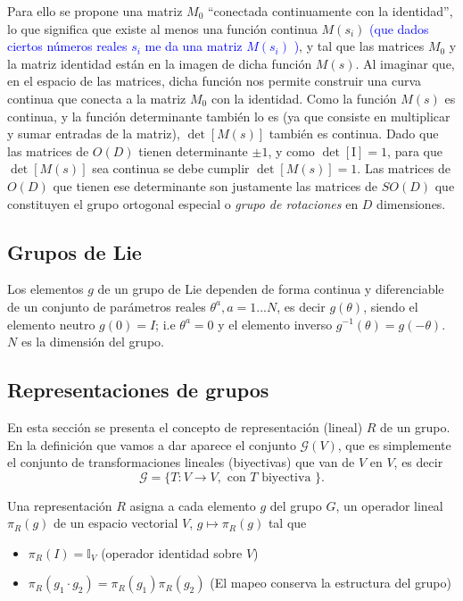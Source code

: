 \begin{solution}
Para ello se propone una matriz $M_{0}$ ``conectada continuamente con la identidad'', lo que significa que existe al menos una función continua $M\left(s_{i}\right)$ \textcolor{blue}{(que dados ciertos números reales $s_{i}$ me da una matriz $M\left(s_{i}\right)$ )}, y tal que las matrices $M_{0}$ y la matriz identidad están en la imagen de dicha función $M(s)$. Al imaginar que, en el espacio de las matrices, dicha función nos permite construir una curva continua que conecta a la matriz $M_{0}$ con la identidad. Como la función $M(s)$ es continua, y la función determinante también lo es (ya que consiste en multiplicar y sumar entradas de la matriz), $\operatorname{det}[M(s)]$ también es continua. Dado que las matrices de $O(D)$ tienen determinante $\pm 1$, y como $\operatorname{det}[\mathrm{I}]=1$, para que $\operatorname{det}[M(s)]$ sea continua se debe cumplir $\operatorname{det}[M(s)]=1$. Las matrices de $O(D)$ que tienen ese determinante son justamente las matrices de $S O(D)$ que constituyen el grupo ortogonal especial o \emph{grupo de rotaciones} en $D$ dimensiones.
\end{solution}

\subsection{Grupos de Lie}
Los elementos $g$ de un grupo de Lie dependen de forma continua y diferenciable de un conjunto de parámetros reales $\theta^{a},a=1...N$, es decir $g(\theta)$, siendo el elemento neutro $g(0) = I$; i.e $\theta^{a}=0$ y el elemento inverso $g^{-1}(\theta) = g(-\theta)$. $N$ es la dimensión del grupo.

\subsection{Representaciones de grupos}
En esta sección se presenta el concepto de representación (lineal) $R$ de un grupo. En la definición que vamos a dar aparece el conjunto $\mathcal{G}(V)$, que es simplemente el conjunto de transformaciones lineales (biyectivas) que van de $V$ en $V$, es decir
$$
\mathcal{G}=\{T: V \rightarrow V, \text { con } T \text { biyectiva }\}.
$$

\begin{definition}[Representación]
Una representación $R$ asigna a cada elemento $g$ del grupo $G$, un operador lineal $\pi_{R}(g)$ de un espacio vectorial $V$, $g \mapsto \pi_{R} (g) $ tal que
 \begin{itemize}
     \item [i)] $\pi_{R}(I)=\mathbb{I}_{V}$ (operador identidad sobre $V$)
     \item[ii)] $\pi_{R}\left(g_{1} \cdot g_{2}\right)=\pi_{R}\left(g_{1}\right) \pi_{R}\left(g_{2}\right)$ (El mapeo conserva la estructura del grupo)
 \end{itemize}
\end{definition}

